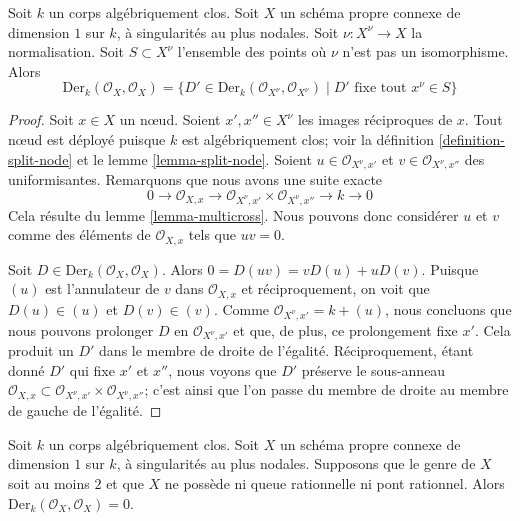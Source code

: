 \begin{lemma}
\label{lemma-nodal-vector-fields}
Soit $k$ un corps algébriquement clos. Soit $X$ un schéma propre connexe de dimension $1$ sur $k$, à singularités au plus nodales. Soit $\nu : X^\nu \to X$ la normalisation. Soit $S \subset X^\nu$ l'ensemble des points où $\nu$ n'est pas un isomorphisme. Alors
$$
\text{Der}_k(\mathcal{O}_X, \mathcal{O}_X) =
\{D' \in \text{Der}_k(\mathcal{O}_{X^\nu}, \mathcal{O}_{X^\nu}) \mid
D' \text{ fixe tout }x^\nu \in S\}
$$
\end{lemma}

\begin{proof}
Soit $x \in X$ un nœud. Soient $x', x'' \in X^\nu$ les images réciproques de $x$. Tout nœud est déployé puisque $k$ est algébriquement clos; voir la définition \ref{definition-split-node} et le lemme \ref{lemma-split-node}. Soient $u \in \mathcal{O}_{X^\nu, x'}$ et $v \in \mathcal{O}_{X^\nu, x''}$ des uniformisantes. Remarquons que nous avons une suite exacte $$
0 \to \mathcal{O}_{X, x} \to
\mathcal{O}_{X^\nu, x'} \times \mathcal{O}_{X^\nu, x''} \to k \to 0
$$ Cela résulte du lemme \ref{lemma-multicross}. Nous pouvons donc considérer $u$ et $v$ comme des éléments de $\mathcal{O}_{X, x}$ tels que $uv = 0$.

\medskip\noindent
Soit $D \in \text{Der}_k(\mathcal{O}_X, \mathcal{O}_X)$. Alors $0 = D(uv) = vD(u) + uD(v)$. Puisque $(u)$ est l'annulateur de $v$ dans $\mathcal{O}_{X, x}$ et réciproquement, on voit que $D(u) \in (u)$ et $D(v) \in (v)$. Comme $\mathcal{O}_{X^\nu, x'} = k + (u)$, nous concluons que nous pouvons prolonger $D$ en $\mathcal{O}_{X^\nu, x'}$ et que, de plus, ce prolongement fixe $x'$. Cela produit un $D'$ dans le membre de droite de l'égalité. Réciproquement, étant donné $D'$ qui fixe $x'$ et $x''$, nous voyons que $D'$ préserve le sous-anneau $\mathcal{O}_{X, x} \subset
\mathcal{O}_{X^\nu, x'} \times \mathcal{O}_{X^\nu, x''}$; c'est ainsi que l'on passe du membre de droite au membre de gauche de l'égalité.
\end{proof}

\begin{lemma}
\label{lemma-stable-vector-fields}
Soit $k$ un corps algébriquement clos. Soit $X$ un schéma propre connexe de dimension $1$ sur $k$, à singularités au plus nodales. Supposons que le genre de $X$ soit au moins $2$ et que $X$ ne possède ni queue rationnelle ni pont rationnel. Alors $\text{Der}_k(\mathcal{O}_X, \mathcal{O}_X) = 0$.
\end{lemma}


